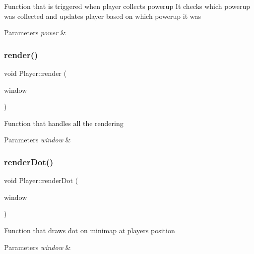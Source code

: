 Function that is triggered when player collects powerup It checks which powerup was collected and updates player based on which powerup it was 


\begin{DoxyParams}{Parameters}
{\em power} & \\
\hline
\end{DoxyParams}
\mbox{\label{class_player_a53938857e80374e79726309e78d1c15c}} 
\subsubsection{\texorpdfstring{render()}{render()}}
{\footnotesize\ttfamily void Player\+::render (\begin{DoxyParamCaption}\item[{sf\+::\+Render\+Window \&}]{window }\end{DoxyParamCaption})}



Function that handles all the rendering 


\begin{DoxyParams}{Parameters}
{\em window} & \\
\hline
\end{DoxyParams}
\mbox{\label{class_player_abadef6be9285e458e5e7e859f4c045d1}} 
\subsubsection{\texorpdfstring{renderDot()}{renderDot()}}
{\footnotesize\ttfamily void Player\+::render\+Dot (\begin{DoxyParamCaption}\item[{sf\+::\+Render\+Window \&}]{window }\end{DoxyParamCaption})}



Function that draws dot on minimap at players position 


\begin{DoxyParams}{Parameters}
{\em window} & \\
\hline
\end{DoxyParams}
\mbox{\label{class_player_a7fcc5871cfe1131a4ab757b6017350c1}} 
